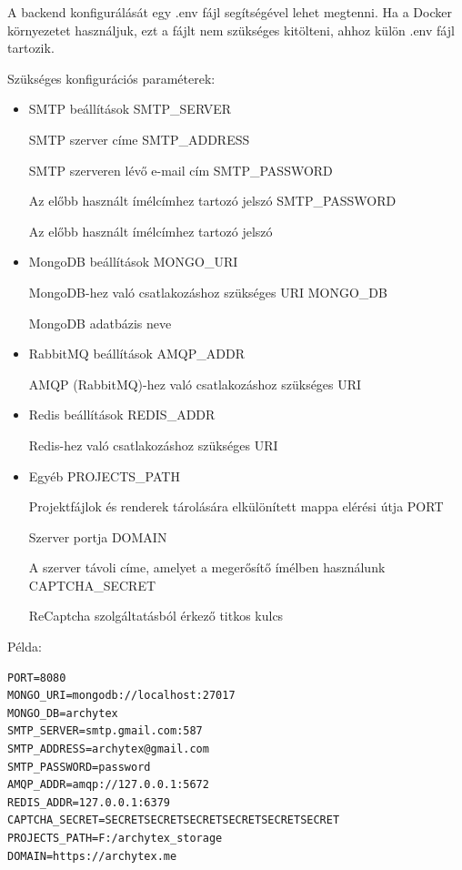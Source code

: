 A backend konfigurálását egy .env fájl segítségével lehet megtenni. Ha a Docker környezetet használjuk, ezt a fájlt nem szükséges kitölteni, ahhoz külön .env fájl tartozik.

Szükséges konfigurációs paraméterek:
\begin{itemize}
  \item SMTP beállítások
        \subitem SMTP\_SERVER

        SMTP szerver címe
        \subitem SMTP\_ADDRESS

        SMTP szerveren lévő e-mail cím
        \subitem SMTP\_PASSWORD

        Az előbb használt ímélcímhez tartozó jelszó
        \subitem SMTP\_PASSWORD

        Az előbb használt ímélcímhez tartozó jelszó
  \item MongoDB beállítások
        \subitem MONGO\_URI

        MongoDB-hez való csatlakozáshoz szükséges URI
        \subitem MONGO\_DB

        MongoDB adatbázis neve
  \item RabbitMQ beállítások
        \subitem AMQP\_ADDR

        AMQP (RabbitMQ)-hez való csatlakozáshoz szükséges URI
  \item Redis beállítások
        \subitem REDIS\_ADDR

        Redis-hez való csatlakozáshoz szükséges URI
  \item Egyéb
        \subitem PROJECTS\_PATH

        Projektfájlok és renderek tárolására elkülönített mappa elérési útja
        \subitem PORT

        Szerver portja
        \subitem DOMAIN

        A szerver távoli címe, amelyet a megerősítő ímélben használunk
        \subitem CAPTCHA\_SECRET

        ReCaptcha szolgáltatásból érkező titkos kulcs
\end{itemize}

Példa:

\begin{lstlisting}
PORT=8080
MONGO_URI=mongodb://localhost:27017
MONGO_DB=archytex
SMTP_SERVER=smtp.gmail.com:587
SMTP_ADDRESS=archytex@gmail.com
SMTP_PASSWORD=password
AMQP_ADDR=amqp://127.0.0.1:5672
REDIS_ADDR=127.0.0.1:6379
CAPTCHA_SECRET=SECRETSECRETSECRETSECRETSECRETSECRET
PROJECTS_PATH=F:/archytex_storage
DOMAIN=https://archytex.me
\end{lstlisting}

